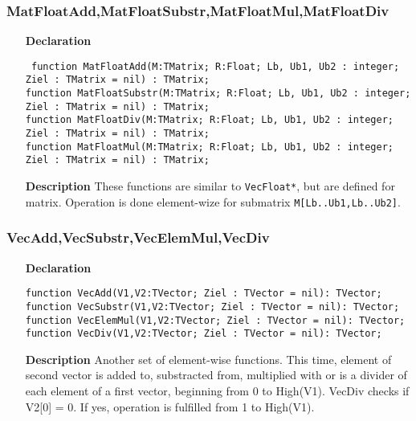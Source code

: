 \documentclass[12pt,a4paper,oneside]{report}
\newcommand{\declarationitem}[1]{\textbf{#1}}
\newcommand{\descriptiontitle}[1]{\textbf{#1}}
\newcommand{\code}[1]{\texttt{#1}}
\begin{document}
\subsubsection{MatFloatAdd,MatFloatSubstr,MatFloatMul,MatFloatDiv}
\label{MatFloatDiv}
\begin{itemize}
	\item[\declarationitem{Declaration}\hfill]\begin{flushleft}
\code{	function MatFloatAdd(M:TMatrix; R:Float; Lb, Ub1, Ub2 : integer; Ziel : TMatrix = nil) : TMatrix;}\\
	\code{function MatFloatSubstr(M:TMatrix; R:Float; Lb, Ub1, Ub2 : integer; Ziel : TMatrix = nil) : TMatrix;}\\
	\code{function MatFloatDiv(M:TMatrix; R:Float; Lb, Ub1, Ub2 : integer; Ziel : TMatrix = nil) : TMatrix;}\\
	\code{function MatFloatMul(M:TMatrix; R:Float; Lb, Ub1, Ub2 : integer; Ziel : TMatrix = nil) : TMatrix;}
	\end{flushleft}
	\item[\descriptiontitle{Description}]These functions are similar to \code{VecFloat*}, but are defined for matrix. Operation is done element-wize for submatrix \code{M[Lb..Ub1,Lb..Ub2]}.
\end{itemize}
\subsubsection{VecAdd,VecSubstr,VecElemMul,VecDiv}
\label{VecAdd}
\begin{itemize}
	\item[\declarationitem{Declaration}\hfill]
	\begin{flushleft}
	\code{function VecAdd(V1,V2:TVector; Ziel : TVector = nil): TVector;}\\
	\code{function VecSubstr(V1,V2:TVector; Ziel : TVector = nil): TVector;}\\
	\code{function VecElemMul(V1,V2:TVector; Ziel : TVector = nil): TVector;}\\
	\code{function VecDiv(V1,V2:TVector; Ziel : TVector = nil): TVector;}
	\end{flushleft}
	\item[\descriptiontitle{Description}]
	Another set of element-wise functions. This time, element of second vector is added to, substracted from, multiplied with or is a divider of each element of a first vector, beginning from 0 to High(V1). VecDiv checks if V2[0] = 0. If yes, operation is fulfilled from 1 to High(V1). 
\end{itemize} 
\end{document}

